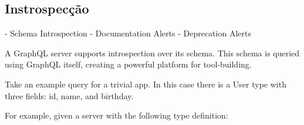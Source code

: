 \subsection[Instrospecção]{Instrospecção}

- Schema Introspection
- Documentation Alerts
- Deprecation Alerts

A GraphQL server supports introspection over its schema. This schema is queried using GraphQL itself, creating a powerful platform for tool‐building.

Take an example query for a trivial app. In this case there is a User type with three fields: id, name, and birthday.

For example, given a server with the following type definition:
